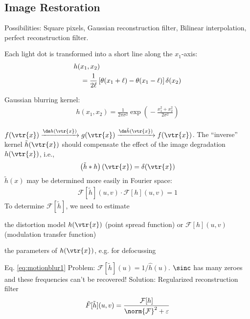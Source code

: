 \begin{compactdesc}
\section{Image Restoration}
	\item[\lp{Pixelization}]
		Possibilities: Square pixels, Gaussian reconstruction filter, Bilinear interpolation, perfect reconstruction filter.
	\item[\lp{Motion blurring}] Each light dot is transformed into a short line along the $x_1$-axis:
		\begin{align*}\scriptscriptstyle
			&h(x_1,x_2)\\
			&\quad=\frac{1}{2\ell}\left[ \theta(x_1+\ell)-\theta(x_1-\ell) \right]\delta(x_2)
		\end{align*}
	\item[\lp{Noise}] Gaussian blurring kernel:
		\begin{gather*}\scriptscriptstyle
			h(x_1,x_2)=\frac{1}{2\pi\sigma^2}\exp\!\left(\!\! -\frac{x_{1}^{2}+x_{2}^{2}}{2\sigma^2}\!\! \right)\!
		\end{gather*}
	\item[\lp{Problem}] $f(\vtr{x})\xrightarrow{\ds h(\vtr{x})}g(\vtr{x})\xrightarrow{\ds\tilde{h}(\vtr{x})}f(\vtr{x})$. The ``inverse'' kernel $\tilde{h}(\vtr{x})$ should compensate the effect of  the image degradation $h(\vtr{x})$, i.e.,
		\begin{gather*}
			\left( \tilde{h}*h \right)(\vtr{x})=\delta(\vtr{x})
		\end{gather*}
		$\tilde{h}(x)$ may be determined more easily in Fourier space:
		\begin{gather*}
			\mathcal{F}\!\left[ \tilde{h} \right]\!(u,v)\cdot\mathcal{F}[h](u,v)=1
		\end{gather*}
		To determine $\mathcal{F}\!\left[ \tilde{h} \right]\!$, we need to estimate
		\begin{inparaenum}[\itshape(1)]
			\item the distortion model $h(\vtr{x})$ (point spread function) or $\mathcal{F}[h](u,v)$ (modulation transfer function)
			\item the parameters of $h(\vtr{x})$, e.g. for defocussing
		\end{inparaenum}
	\item[\lp{Motion Blur FT}] Eq. \ref{eq:motionblur1}
		Problem: $\mathcal{F}[\tilde{h}](u)=1/\hat{h}(u)$. $\sinc$ has many zeroes and these frequencies can't be recovered! Solution: Regularized reconstruction filter
		\begin{gather*}
			\tilde{F}[\tilde{h}](u,v)=\frac{\mathcal{F}[h]}{\norm{\mathcal{F}}^2+\varepsilon}

\end{gather*}
\end{compactdesc}
